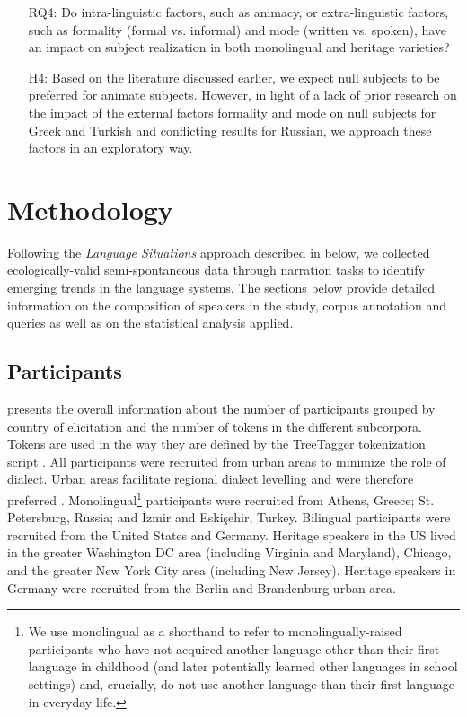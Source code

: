 \documentclass[output=paper,colorlinks,citecolor=brown]{langscibook}
\begin{document}
\begin{enumerate}
\sloppy
\item[RQ4:] Do intra-linguistic factors, such as animacy, or extra-linguistic factors, such as formality (formal vs. informal) and mode (written vs. spoken), have an impact on subject realization in both monolingual and heritage varieties?
    
\item[H4:] Based on the literature discussed earlier, we expect null subjects to be preferred for animate subjects. 
However, in light of a lack of prior research on the impact of the external factors formality and mode on null subjects for Greek and Turkish and conflicting results for Russian, we approach these factors in an exploratory way.
\end{enumerate}

\section{Methodology} \label{sec:oezsoy:6Methodology}
Following the \textit{Language Situations} approach \parencite{wiese2020language} described in  below, we collected ecologically-valid semi-spontaneous data through narration tasks to identify emerging trends in the language systems.
The sections below provide detailed information on the composition of speakers in the study, corpus annotation and queries as well as on the statistical analysis applied.

\subsection{Participants}
\begin{sloppypar}
 presents the overall information about the  number of participants grouped by country of elicitation and the number of tokens in the different subcorpora. Tokens are used in the way they are defined by the TreeTagger tokenization script \parencite{schmid2013probabilistic}. 
All participants were recruited from urban areas to minimize the role of dialect. Urban areas facilitate regional dialect levelling and were therefore preferred \parencite{britain2010supralocal}. 
Monolingual\footnote{We use monolingual as a shorthand to refer to monolingually-raised participants who have not acquired another language other than their first language in childhood (and later potentially learned other languages in school settings) and, crucially, do not use another language than their first language in everyday life.}  participants were recruited from Athens, Greece; St. Petersburg, Russia; and İzmir and Eskişehir, Turkey. 
Bilingual participants were recruited from the United States and Germany. 
Heritage speakers in the US lived in the greater Washington DC area (including Virginia and Maryland), Chicago, and the greater New York City area (including New Jersey).
Heritage speakers in Germany were recruited from the Berlin and Brandenburg urban area.
\end{sloppypar}
\end{document}

